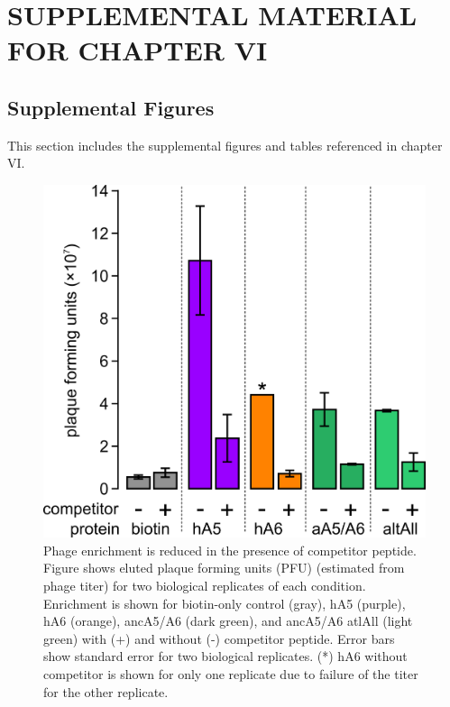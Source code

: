 \chapter{SUPPLEMENTAL MATERIAL FOR CHAPTER VI}

\section{Supplemental Figures}
This section includes the supplemental figures and tables referenced in chapter VI.


\begin{figure}%
\centering
	\includegraphics{ch6-figS1.png} 
\caption[Phage enrichment is reduced by the competitor
peptide]{Phage enrichment is reduced in the presence of competitor
peptide. Figure shows eluted plaque forming units (PFU) (estimated
from phage titer) for two biological replicates of each condition.
Enrichment is shown for biotin-only control (gray), hA5 (purple),
hA6 (orange), ancA5/A6 (dark green), and ancA5/A6 atlAll (light green)
with (+) and without (-) competitor peptide. Error bars show standard
error for two biological replicates. ({*}) hA6 without competitor
is shown for only one replicate due to failure of the titer for the
other replicate.\label{samplefigure}}	
\end{figure}


